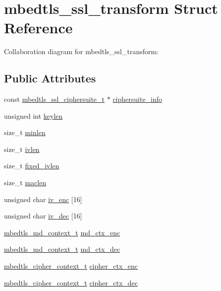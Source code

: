 \hypertarget{structmbedtls__ssl__transform}{}\section{mbedtls\+\_\+ssl\+\_\+transform Struct Reference}
\label{structmbedtls__ssl__transform}


Collaboration diagram for mbedtls\+\_\+ssl\+\_\+transform\+:
\subsection*{Public Attributes}
\begin{DoxyCompactItemize}
\item 
const \mbox{\hyperlink{structmbedtls__ssl__ciphersuite__t}{mbedtls\+\_\+ssl\+\_\+ciphersuite\+\_\+t}} $\ast$ \mbox{\hyperlink{structmbedtls__ssl__transform_a669b64ca817f92c2f2da4531745b5563}{ciphersuite\+\_\+info}}
\item 
unsigned int \mbox{\hyperlink{structmbedtls__ssl__transform_aacb827d7f8a0d31359870c64d213baa9}{keylen}}
\item 
size\+\_\+t \mbox{\hyperlink{structmbedtls__ssl__transform_aaa43c099c7bc4f20f283362fd2feb619}{minlen}}
\item 
size\+\_\+t \mbox{\hyperlink{structmbedtls__ssl__transform_aabfe6c0fea0a8bcaa89823c2f06d885a}{ivlen}}
\item 
size\+\_\+t \mbox{\hyperlink{structmbedtls__ssl__transform_aeb9dc8aee94effb34d725e259e390c2d}{fixed\+\_\+ivlen}}
\item 
size\+\_\+t \mbox{\hyperlink{structmbedtls__ssl__transform_a2b616bec2cc218b736dffe87e58efc56}{maclen}}
\item 
unsigned char \mbox{\hyperlink{structmbedtls__ssl__transform_a5dc42f2d1f720d396c35eb355cba69e2}{iv\+\_\+enc}} \mbox{[}16\mbox{]}
\item 
unsigned char \mbox{\hyperlink{structmbedtls__ssl__transform_ad31f126ea147ffa513cc4ad170d2ff25}{iv\+\_\+dec}} \mbox{[}16\mbox{]}
\item 
\mbox{\hyperlink{structmbedtls__md__context__t}{mbedtls\+\_\+md\+\_\+context\+\_\+t}} \mbox{\hyperlink{structmbedtls__ssl__transform_a17f516488ea4254947d296a53c527af8}{md\+\_\+ctx\+\_\+enc}}
\item 
\mbox{\hyperlink{structmbedtls__md__context__t}{mbedtls\+\_\+md\+\_\+context\+\_\+t}} \mbox{\hyperlink{structmbedtls__ssl__transform_a9d9d8245fb1000d30a9a63191cddf0e0}{md\+\_\+ctx\+\_\+dec}}
\item 
\mbox{\hyperlink{structmbedtls__cipher__context__t}{mbedtls\+\_\+cipher\+\_\+context\+\_\+t}} \mbox{\hyperlink{structmbedtls__ssl__transform_a4a1c49f6f40086491dd8dd059f163a61}{cipher\+\_\+ctx\+\_\+enc}}
\item 
\mbox{\hyperlink{structmbedtls__cipher__context__t}{mbedtls\+\_\+cipher\+\_\+context\+\_\+t}} \mbox{\hyperlink{structmbedtls__ssl__transform_a8f7e9c4b90dda8083df54037e5be955e}{cipher\+\_\+ctx\+\_\+dec}}
\end{DoxyCompactItemize}


